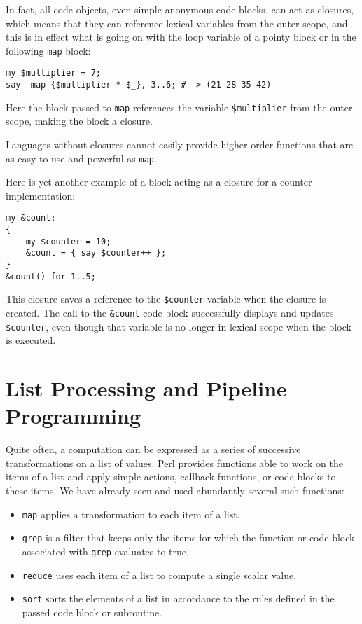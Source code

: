 In fact, all code objects, even simple anonymous code 
blocks, can act as closures, which means that they can 
reference lexical variables from the outer scope, and this 
is in effect what is going on with the loop variable of 
a pointy block or in the following {\tt map} block:

\begin{verbatim}
my $multiplier = 7;
say  map {$multiplier * $_}, 3..6; # -> (21 28 35 42)
\end{verbatim}

Here the block passed to \verb'map' references the variable 
\verb'$multiplier' from the outer scope, making the 
block a closure.

Languages without closures cannot easily provide 
higher-order functions that are as easy to use and 
powerful as {\tt map}.

Here is yet another example of a block acting as a 
closure for a counter implementation:

\begin{verbatim}
my &count;
{
    my $counter = 10;
    &count = { say $counter++ };
}
&count() for 1..5;  
\end{verbatim}

This closure saves a reference to the \verb'$counter' 
variable when the closure is created. The call to the 
\verb'&count' code block successfully displays and 
updates \verb'$counter', even though that variable is no
longer in lexical scope when the block is executed.

\section{List Processing and Pipeline Programming}

Quite often, a computation can be expressed as a 
series of successive transformations on a list of 
values. Perl provides functions able to work on 
the items of a list and apply simple actions, 
callback functions, or code blocks to these items. 
We have already seen and used abundantly several 
such functions:
\begin{itemize}
\item {\tt map} applies a transformation to each item 
of a list.
 
\item {\tt grep} is a filter that keeps only the items 
for which the function or code block associated with 
{\tt grep} evaluates to true. 	
 
\item {\tt reduce} uses each item of a list to compute 
a single scalar value.
 
\item {\tt sort} sorts the elements of a list in accordance 
to the rules defined in the passed code block or 
subroutine. 
 
\end{itemize}

